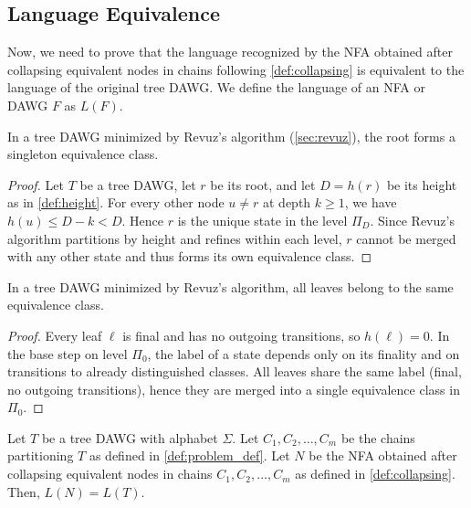 \subsection{Language Equivalence}
Now, we need to prove that the language recognized by the NFA obtained after collapsing equivalent nodes in chains following \cref{def:collapsing} is equivalent to the language of the original tree DAWG. We define the language of an NFA or DAWG $F$ as $L(F)$.

\begin{lemma}
    \label{lemma:root_singleton}
    In a tree DAWG minimized by Revuz’s algorithm (\cref{sec:revuz}), the root forms a singleton equivalence class.
\end{lemma}
\begin{proof}
    Let $T$ be a tree DAWG, let $r$ be its root, and let $D = h(r)$ be its height as in \cref{def:height}. For every other node $u \neq r$ at depth $k \ge 1$, we have $h(u) \le D - k < D$. Hence $r$ is the unique state in the level $\Pi_D$. Since Revuz’s algorithm partitions by height and refines within each level, $r$ cannot be merged with any other state and thus forms its own equivalence class.
\end{proof}

\begin{lemma}
    \label{lemma:all_leaves_same_class}
    In a tree DAWG minimized by Revuz’s algorithm, all leaves belong to the same equivalence class.
\end{lemma}
\begin{proof}
    Every leaf $\ell$ is final and has no outgoing transitions, so $h(\ell) = 0$. In the base step on level $\Pi_0$, the label of a state depends only on its finality and on transitions to already distinguished classes. All leaves share the same label (final, no outgoing transitions), hence they are merged into a single equivalence class in $\Pi_0$.
\end{proof}

\begin{lemma}
    \label{lemma:collapsing_equivalence}
    Let $T$ be a tree DAWG with alphabet $\Sigma$. Let $C_1, C_2, \ldots, C_m$ be the chains partitioning $T$ as defined in \cref{def:problem_def}. Let $N$ be the NFA obtained after collapsing equivalent nodes in chains $C_1, C_2, \ldots, C_m$ as defined in \cref{def:collapsing}. Then, $L(N) = L(T)$.
\end{lemma}

